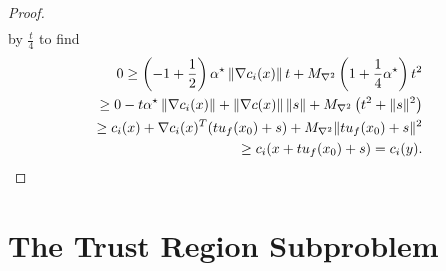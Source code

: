 \begin{proof}
\begin{align*}
\end{align*}
by $\frac t 4$ to find
\begin{align*}
0 \ge \left(-1 + \frac 1 2\right) { \alpha^{\star} } \left\|\nabla c_i(x)\right\| t +  {M_{\nabla^2}}\left(1 + \frac 1 4 { \alpha^{\star} }\right) t^2 \\
\ge 0 -  t{ \alpha^{\star} } \left\| \nabla c_i(x) \right\| + \left\| \nabla c(x)\right\| \left\|s\right\| + {M_{\nabla^2}}\left(t^2 + \|s\|^2\right) \\
\ge c_i(x) + \nabla c_i(x)^T (t {u_{f}(x_0)} + s) + {M_{\nabla^2}} \|t {u_{f}(x_0)} + s\|^2 \\
\ge c_i(x + t {u_{f}(x_0)} + s) = c_i(y).
\end{align*}


\end{proof}



% 
% 




\section{The Trust Region Subproblem}
\label{decreasing_the_trust_region_for_infeasible_trial}


